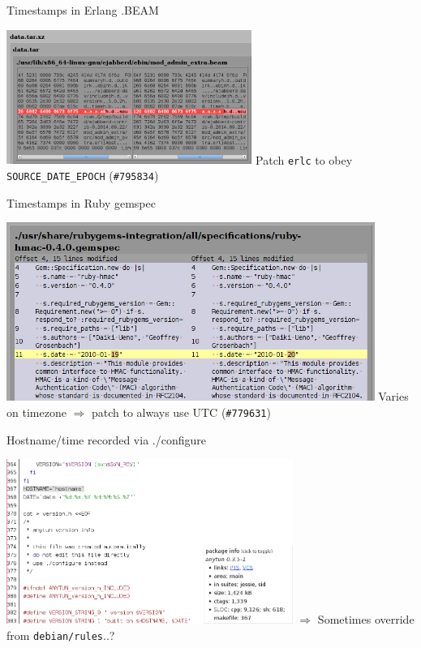 \documentclass[14pt]{beamer}
\begin{document}

\begin{frame}{Timestamps in Erlang .BEAM}
 \begin{center}
  \includegraphics[width=0.6\textwidth]{images/examples/timestamps_in_beam.png}
  \vfill
  \vfill
  Patch \texttt{erlc} to obey \texttt{SOURCE\_DATE\_EPOCH} (\texttt{\#795834})
 \end{center}
\end{frame}

\begin{frame}{Timestamps in Ruby gemspec}
 \begin{center}
  \includegraphics[width=0.9\textwidth]{images/examples/timestamps_in_ruby_gemspec.png}
  \vfill
  Varies on timezone $\Longrightarrow$ patch to always use UTC (\texttt{\#779631})
 \end{center}
\end{frame}


\begin{frame}{Hostname/time recorded via ./configure}
 \begin{center}
  \includegraphics[width=0.7\textwidth]{images/examples/hostname_in_configure.png}
  \vfill
  $\Longrightarrow$ Sometimes override from \texttt{debian/rules}..?
 \end{center}
\end{frame}
\end{document}
